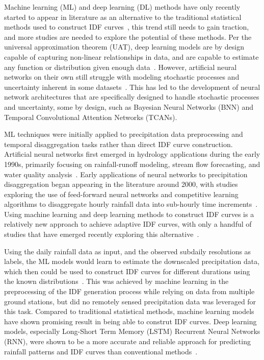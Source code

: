 Machine learning (ML) and deep learning (DL) methods have only recently started to appear in literature as an alternative to the traditional statistical methods used to construct IDF curves~\cite{13}, this trend still needs to gain traction, and more studies are needed to explore the potential of these methods. Per the universal approximation theorem (UAT), deep learning models are by design capable of capturing non-linear relationships in data, and are capable to estimate any function or distribution given enough data~\cite{15}. However, artificial neural networks on their own still struggle with modeling stochastic processes and uncertainty inherent in some datasets~\cite{16}. This has led to the development of neural network architectures that are specifically designed to handle stochastic processes and uncertainty, some by design, such as Bayesian Neural Networks (BNN) and Temporal Convolutional Attention Networks (TCANs).~\cite{17, 18}

\vspace{1em}

ML techniques were initially applied to precipitation data preprocessing and temporal disaggregation tasks rather than direct IDF curve construction. Artificial neural networks first emerged in hydrology applications during the early 1990s, primarily focusing on rainfall-runoff modeling, stream flow forecasting, and water quality analysis~\cite{19}. Early applications of neural networks to precipitation disaggregation began appearing in the literature around 2000, with studies exploring the use of feed-forward neural networks and competitive learning algorithms to disaggregate hourly rainfall data into sub-hourly time increments~\cite{19}. Using machine learning and deep learning methods to construct IDF curves is a relatively new approach to achieve adaptive IDF curves, with only a handful of studies that have emerged recently exploring this alternative~\cite{13, 14}.

\vspace{1em}

Using the daily rainfall data as input, and the observed subdaily resolutions as labels, the ML models would learn to estimate the downscaled precipitation data, which then could be used to construct IDF curves for different durations using the known distributions~\cite{20}. This was achieved by machine learning in the preprocessing of the IDF generation process while relying on data from multiple ground stations, but did no remotely sensed precipitation data was leveraged for this task. Compared to traditional statistical methods, machine learning models have shown promising result in being able to construt IDF curves. Deep learning models, especially Long-Short Term Memory (LSTM) Recurrent Neural Networks (RNN), were shown to be a more accurate and reliable approach for predicting rainfall patterns and IDF curves than conventional methods~\cite{14}.
